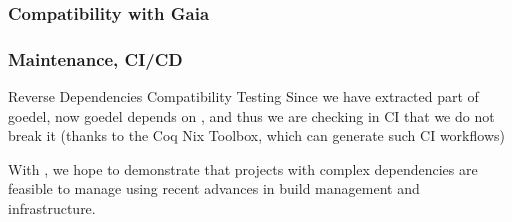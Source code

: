 \documentclass[10pt, fleqn]{beamer}
\begin{document}


\begin{frame}
  \frametitle{Compatibility with Gaia}
  \begin{block}{}
    {\footnotesize
      }
    
  \end{block}
\end{frame}

\begin{frame}
  \frametitle{Maintenance, CI/CD}
 

  \begin{block}{Reverse Dependencies Compatibility Testing}
    Since we have extracted part of {\color{plugincolor}goedel}, now {\color{plugincolor}goedel} depends on {\color{plugincolor}\Hydras}, and thus we are checking in CI that we do not break it (thanks to the \textcolor{lookcolor}{Coq Nix Toolbox},
    which can generate such CI workflows)
  \end{block}

  \begin{block}{}
    With \Hydras, we hope to demonstrate that projects with complex dependencies are feasible to manage using recent advances in build management and infrastructure.
  \end{block}

\end{frame}

\end{document}
